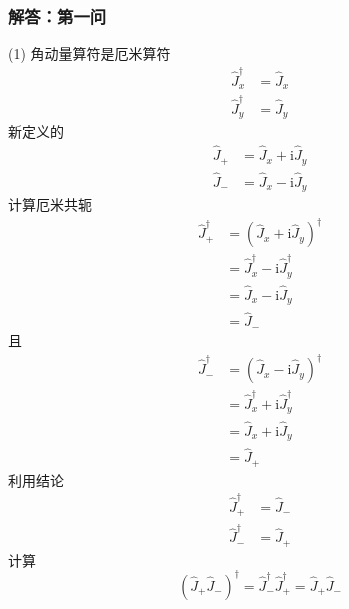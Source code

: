 \subsubsection{解答：第一问}
(1)
角动量算符是厄米算符
\begin{equation}
    \begin{aligned}
        \hat{J}_{x}^{\dagger}&=\hat{J}_x
\\
\hat{J}_{y}^{\dagger}&=\hat{J}_y
    \end{aligned}
\end{equation}
新定义的
\begin{equation}
    \begin{aligned}
        \hat{J}_+&=\hat{J}_x+\mathrm{i}\hat{J}_y
\\
\hat{J}_-&=\hat{J}_x-\mathrm{i}\hat{J}_y
    \end{aligned}
\end{equation}
计算厄米共轭
\begin{equation}
    \begin{aligned}
        \hat{J}_{+}^{\dagger}&=\left( \hat{J}_x+\mathrm{i}\hat{J}_y \right) ^{\dagger}
\\
&=\hat{J}_{x}^{\dagger}-\mathrm{i}\hat{J}_{y}^{\dagger}
\\
&=\hat{J}_x-\mathrm{i}\hat{J}_y
\\
&=\hat{J}_-
    \end{aligned}
\end{equation}
且
\begin{equation}
    \begin{aligned}
        \hat{J}_{-}^{\dagger}&=\left( \hat{J}_x-\mathrm{i}\hat{J}_y \right) ^{\dagger}
\\
&=\hat{J}_{x}^{\dagger}+\mathrm{i}\hat{J}_{y}^{\dagger}
\\
&=\hat{J}_x+\mathrm{i}\hat{J}_y
\\
&=\hat{J}_+
    \end{aligned}
\end{equation}
利用结论
\begin{equation}
    \begin{aligned}
        \hat{J}_{+}^{\dagger}&=\hat{J}_-
\\
\hat{J}_{-}^{\dagger}&=\hat{J}_+
    \end{aligned}
\end{equation}
计算
\begin{equation}
    \left( \hat{J}_+\hat{J}_- \right) ^{\dagger}=\hat{J}_{-}^{\dagger}\hat{J}_{+}^{\dagger}=\hat{J}_+\hat{J}_-
\end{equation}

